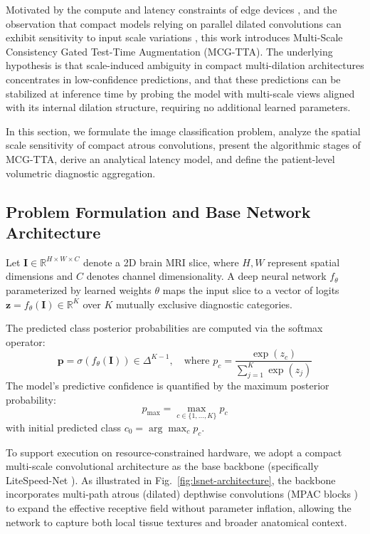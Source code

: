 \documentclass[journal]{IEEEtran}
\begin{document}
Motivated by the compute and latency constraints of edge devices \cite{9, 20, 21}, and the observation that compact models relying on parallel dilated convolutions can exhibit sensitivity to input scale variations \cite{5, 16}, this work introduces Multi-Scale Consistency Gated Test-Time Augmentation (MCG-TTA). The underlying hypothesis is that scale-induced ambiguity in compact multi-dilation architectures concentrates in low-confidence predictions, and that these predictions can be stabilized at inference time by probing the model with multi-scale views aligned with its internal dilation structure, requiring no additional learned parameters.

In this section, we formulate the image classification problem, analyze the spatial scale sensitivity of compact atrous convolutions, present the algorithmic stages of MCG-TTA, derive an analytical latency model, and define the patient-level volumetric diagnostic aggregation.

\subsection{Problem Formulation and Base Network Architecture}

Let $\mathbf{I} \in \mathbb{R}^{H \times W \times C}$ denote a 2D brain MRI slice, where $H, W$ represent spatial dimensions and $C$ denotes channel dimensionality. A deep neural network $f_\theta$ parameterized by learned weights $\theta$ maps the input slice to a vector of logits $\mathbf{z} = f_\theta(\mathbf{I}) \in \mathbb{R}^K$ over $K$ mutually exclusive diagnostic categories. 

The predicted class posterior probabilities are computed via the softmax operator:
\begin{equation}
\mathbf{p} = \sigma\left(f_\theta(\mathbf{I})\right) \in \Delta^{K-1}, \quad \text{where } p_c = \frac{\exp(z_c)}{\sum_{j=1}^K \exp(z_j)}
\label{eq:softmax}
\end{equation}
The model's predictive confidence is quantified by the maximum posterior probability:
\begin{equation}
p_{\max} = \max_{c \in \{1, \dots, K\}} p_c
\end{equation}
with initial predicted class $c_0 = \arg\max_c p_c$.

To support execution on resource-constrained hardware, we adopt a compact multi-scale convolutional architecture as the base backbone (specifically LiteSpeed-Net \cite{16}). As illustrated in Fig.~\ref{fig:lsnet-architecture}, the backbone incorporates multi-path atrous (dilated) depthwise convolutions (MPAC blocks \cite{16}) to expand the effective receptive field without parameter inflation, allowing the network to capture both local tissue textures and broader anatomical context.
\end{document}
